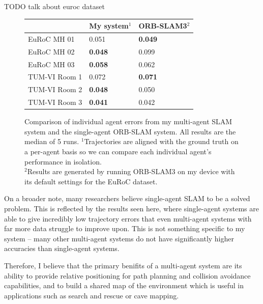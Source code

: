 TODO talk about euroc dataset

\begin{figure}[h]
    \centering
    \def\arraystretch{1.2}
    \begin{tabular}{ |l|l|l| }
        \cline{2-3}
        \multicolumn{1}{c|}{} & My system$^1$  & ORB-SLAM3$^2$  \\
        \hline
        EuRoC MH 01           & 0.051          & \textbf{0.049} \\
        EuRoC MH 02           & \textbf{0.048} & 0.099          \\
        EuRoC MH 03           & \textbf{0.058} & 0.062          \\
        \hline
        TUM-VI Room 1         & 0.072          & \textbf{0.071} \\
        TUM-VI Room 2         & \textbf{0.048} & 0.050          \\
        TUM-VI Room 3         & \textbf{0.041} & 0.042          \\
        \hline
    \end{tabular}

    \caption{Comparison of individual agent errors from my multi-agent SLAM system and the single-agent ORB-SLAM system. All results are the median of 5 runs. \captionbreak $^1$Trajectories are aligned with the ground truth on a per-agent basis so we can compare each individual agent's performance in isolation. \\ $^2$Results are generated by running ORB-SLAM3 on my device with its default settings for the EuRoC dataset.}
    \label{fig:comparison-to-single-agent-systems}
\end{figure}

On a broader note, many researchers believe single-agent SLAM to be a solved problem. This is reflected by the results seen here, where single-agent systems are able to give incredibly low trajectory errors that even multi-agent systems with far more data struggle to improve upon. This is not something specific to my system – many other multi-agent systems do not have significantly higher accuracies than single-agent systems.

Therefore, I believe that the primary benifits of a multi-agent system are its ability to provide relative positioning for path planning and collision avoidance capabilities, and to build a shared map of the environment which is useful in applications such as search and rescue or cave mapping.

